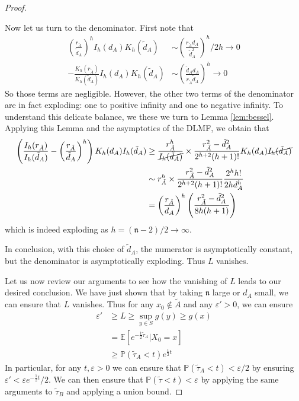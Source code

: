\documentclass[english, aip, jcp, priprint, graphicx,floatfix]{revtex4-1}
\theoremstyle{plain}
\theoremstyle{definition}
\theoremstyle{plain}
\newcommand{\dimension}{{\mathfrak{n}}}
\begin{document}
\begin{proof}
\begin{itemize}
    Now let us turn to the denominator.  First note that 
    \begin{align*}
     \left( \frac{r_{\tilde{A}}}{\tilde{d}_A}\right)^h  
                I_h (d_A)K_h ( \tilde{d}_A) &\sim \left(\frac{r_{\tilde{A}} d_A}{\tilde d_A^2}\right)^h/2h \rightarrow 0\\
     - \frac{K_h ( r_{\tilde{A}})}{K_h ( \tilde{d}_A)} 
                I_h (d_A)K_h ( \tilde{d}_A) &\sim \left(\frac{\tilde d_A d_A}{r_{\tilde A}\tilde d_A}\right)^h \rightarrow 0
    \end{align*}
    So those terms are negligible.  However, the other two terms of the denominator are in fact exploding: one to positive infinity and one to negative infinity.  To understand this delicate balance, we these we turn to Lemma \ref{lem:bessel}.  Applying this Lemma and the asymptotics of the DLMF, we obtain that
    \begin{align*}
    \left( \frac{I_h ( r_{\tilde{A}})}{I_h ( \tilde{d}_A)} - \left(\frac{r_{\tilde{A}}}{\tilde{d}_A} \right)^h  \right)
                K_h ( d_A) I_h ( \tilde{d}_A) 
        &\geq \frac{r_{\tilde{A}}^h}{\cancel{I_h(\tilde{d}_A)}}\times\frac{r_{\tilde{A}}^{2} -\tilde{d}_A^{2}}{2^{h+2}(h+1)!} K_h ( d_A) \cancel{I_h ( \tilde{d}_A)} \\
        &\sim r_{\tilde{A}}^h\times\frac{r_{\tilde{A}}^{2} -\tilde{d}_A^{2}}{2^{h+2}(h+1)!} \frac{2^h h!}{2hd_A^h}  \\
        &=\left(\frac{r_{\tilde{A}}}{d_A} \right)^h \left(\frac{r_{\tilde A}^2 - \tilde d_A^2}{8h(h+1)}\right)
    \end{align*}
    which is indeed exploding as $h=(\dimension-2)/2 \rightarrow \infty$.  

    In conclusion, with this choice of $\tilde d_A$, the numerator is asymptotically constant, but the denominator is asymptotically exploding.  Thus $L$ vanishes.
\end{itemize}

Let us now review our arguments to see how the vanishing of $L$ leads to our desired conclusion.  We have just shown that by taking $\dimension$ large or $d_A$ small, we can ensure that $L$ vanishes.  Thus for any $x_0\notin \tilde A$ and any $\varepsilon'>0$, we can ensure
\begin{align*}
\varepsilon' & \geq L \geq \sup_{y \in S} g(y) \geq g(x) \\
            & = \mathbb{E}[e^{-\frac{1}{2}\tilde \tau_A}|X_0=x]\\
            & \geq \mathbb{P}(\tilde \tau_A < t) e^{\frac{1}{2} t}
\end{align*}
In particular, for any $t,\varepsilon>0$ we can ensure that $\mathbb{P}(\tilde \tau_A < t)<\varepsilon/2$ by ensuring $\varepsilon' < \varepsilon e^{-\frac{1}{2} t}/2$.  We can then ensure that $\mathbb{P}(\tilde \tau < t)<\varepsilon$ by applying the same arguments to $\tilde \tau_B$ and applying a union bound.

\end{proof}
\end{document}

